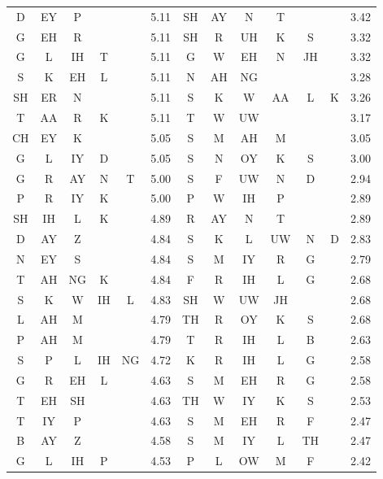 \begin{center}
\begin{longtable}{c@{ } c@{ } c@{ } c@{ } c r | c@{ } c@{ } c@{ } c@{ } c@{ } c r }
D  & EY & P  &    &         & 5.11  & SH & AY & N  & T  &    &     & 3.42 \\ 
G  & EH & R  &    &         & 5.11  & SH & R  & UH & K  & S  &     & 3.32 \\
G  & L  & IH & T  &         & 5.11  & G  & W  & EH & N  & JH &     & 3.32 \\
S  & K  & EH & L  &         & 5.11  & N  & AH & NG &    &    &     & 3.28 \\
SH & ER & N  &    &         & 5.11  & S  & K  & W  & AA & L  & K   & 3.26 \\
T  & AA & R  & K  &         & 5.11  & T  & W  & UW &    &    &     & 3.17 \\
CH & EY & K  &    &         & 5.05  & S  & M  & AH & M  &    &     & 3.05 \\
G  & L  & IY & D  &         & 5.05  & S  & N  & OY & K  & S  &     & 3.00 \\
G  & R  & AY & N  & T       & 5.00  & S  & F  & UW & N  & D  &     & 2.94 \\
P  & R  & IY & K  &         & 5.00  & P  & W  & IH & P  &    &     & 2.89 \\
SH & IH & L  & K  &         & 4.89  & R  & AY & N  & T  &    &     & 2.89 \\
D  & AY & Z  &    &         & 4.84  & S  & K  & L  & UW & N  & D   & 2.83 \\
N  & EY & S  &    &         & 4.84  & S  & M  & IY & R  & G  &     & 2.79 \\
T  & AH & NG & K  &         & 4.84  & F  & R  & IH & L  & G  &     & 2.68 \\
S  & K  & W  & IH & L       & 4.83  & SH & W  & UW & JH &    &     & 2.68 \\
L  & AH & M  &    &         & 4.79  & TH & R  & OY & K  & S  &     & 2.68 \\
P  & AH & M  &    &         & 4.79  & T  & R  & IH & L  & B  &     & 2.63 \\
S  & P  & L  & IH & NG      & 4.72  & K  & R  & IH & L  & G  &     & 2.58 \\
G  & R  & EH & L  &         & 4.63  & S  & M  & EH & R  & G  &     & 2.58 \\
T  & EH & SH &    &         & 4.63  & TH & W  & IY & K  & S  &     & 2.53 \\
T  & IY & P  &    &         & 4.63  & S  & M  & EH & R  & F  &     & 2.47 \\
B  & AY & Z  &    &         & 4.58  & S  & M  & IY & L  & TH &     & 2.47 \\
G  & L  & IH & P  &         & 4.53  & P  & L  & OW & M  & F  &     & 2.42 \\

\end{longtable}
\end{center}
